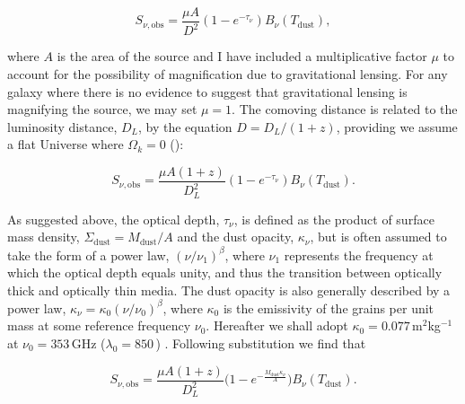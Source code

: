 \begin{equation}
	S_{\nu, \textrm{obs}} = \frac{\mu A}{D^2}(1 - e^{-\tau_\nu}) B_\nu(T_{\textrm{dust}}),
\label{eq:modified_blackbody_area}
\end{equation}

where $A$ is the area of the source and I have included a multiplicative factor $\mu$ to account for the possibility of magnification due to gravitational lensing. For any galaxy where there is no evidence to suggest that gravitational lensing is magnifying the source, we may set $\mu = 1$. The comoving distance is related to the luminosity distance, $D_L$, by the equation $D = D_L/(1+z)$, providing we assume a flat Universe where $\Omega_k = 0$ (\citealt{Hogg_1999}):

\begin{equation}
	S_{\nu, \textrm{obs}} = \frac{\mu A (1+z)}{D_L^2}(1 - e^{-\tau_\nu}) B_\nu(T_{\textrm{dust}}).
	\label{eq:modified_blackbody_area_dl}
\end{equation}

As suggested above, the optical depth, $\tau_\nu$, is defined as the product of surface mass density, $\Sigma_{\textrm{dust}} = M_{\textrm{dust}}/A$ and the dust opacity, $\kappa_\nu$, but is often assumed to take the form of a power law, $(\nu/\nu_1)^\beta$, where $\nu_1$ represents the frequency at which the optical depth equals unity, and thus the transition between optically thick and optically thin media. The dust opacity is also generally described by a power law, $\kappa_\nu = \kappa_0(\nu/\nu_0)^\beta$, where $\kappa_0$ is the emissivity of the grains per unit mass at some reference frequency $\nu_0$. Hereafter we shall adopt $\kappa_0 = 0.077$\,m$^2$kg$^{-1}$ at $\nu_0 = 353$\,GHz ($\lambda_0 = 850$\,\micron) . Following substitution we find that

\begin{equation}
	S_{\nu, \textrm{obs}} = \frac{\mu A (1+z)}{D_L^2}\Bigg(1 - e^{- \frac{M_{\textrm{dust}}\kappa_\nu}{A}}\Bigg) B_\nu(T_{\textrm{dust}}).
	\label{eq:modified_blackbody_general_opacity_a}
\end{equation}

